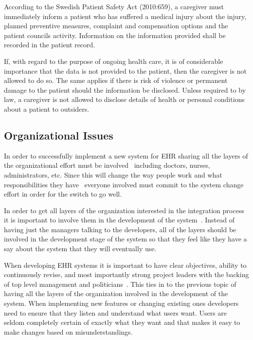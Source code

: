 \documentclass[14pt]{article}
\begin{document}
According to the Swedish Patient Safety Act (2010:659), a caregiver must immediately inform a patient who has suffered a medical injury about the injury, planned preventive measures, complaint and compensation
options and the patient councils activity. Information on the information provided shall be recorded in the patient record.\cite{PatientSafetyAct}

If, with regard to the purpose of ongoing health care, it is of considerable importance that the data is not provided to the patient, then the caregiver is not allowed to do so. The same applies if there is risk of violence or permanent damage to the patient should the information be disclosed. Unless required to by law, a caregiver is not allowed to disclose details of health or personal conditions about a patient to outsiders.\cite{PatientSafetyAct}

\subsection{Organizational Issues}
\label{sec:futureOrganizational}
In order to successfully implement a new system for \gls{EHR} sharing all the layers of the organizational effort must be involved~\cite{Empirica} including doctors, nurses, administrators, etc. Since this will change the way people work and what responsibilities they have~\cite{Empirica} everyone involved must commit to the system change effort in order for the switch to go well.

In order to get all layers of the organization interested in the integration process it is important to involve them in the development of the system~\cite{Empirica}. Instead of having just the managers talking to the developers, all of the layers should be involved in the development stage of the system so that they feel like they have a say about the system that they will eventually use.

When developing \gls{EHR} systems it is important to have clear objectives, ability to continuously revise, and most importantly strong project leaders with the backing of top level management and politicians~\cite{Empirica}. This ties in to the previous topic of having all the layers of the organization involved in the development of the system. When implementing new features or changing existing ones developers need to ensure that they listen and understand what users want. Users are seldom completely certain of exactly what they want and that makes it easy to make changes based on misunderstandings.
\end{document}
